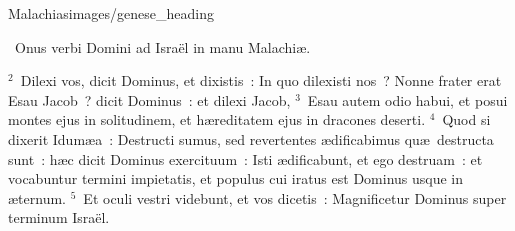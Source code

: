 {Malachias}{images/genese_heading}

~\lettrine[lines=10,image=true,loversize=0.05,lraise=-0.03]{O}{}nus verbi Domini ad Isra\"el in manu Malachi\ae .


${}^{2}$~Dilexi vos, dicit Dominus, et dixistis~: In quo dilexisti nos~? Nonne frater erat Esau Jacob~? dicit Dominus~: et dilexi Jacob,
${}^{3}$~Esau autem odio habui, et posui montes ejus in solitudinem, et h\ae reditatem ejus in dracones deserti.
${}^{4}$~Quod si dixerit Idum\ae a~: Destructi sumus, sed revertentes \ae dificabimus qu\ae\ destructa sunt~: h\ae c dicit Dominus exercituum~: Isti \ae dificabunt, et ego destruam~: et vocabuntur termini impietatis, et populus cui iratus est Dominus usque in \ae ternum.
${}^{5}$~Et oculi vestri videbunt, et vos dicetis~: Magnificetur Dominus super terminum Isra\"el.


